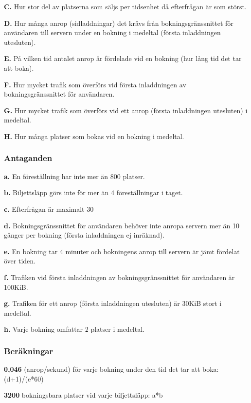 \documentclass[a4paper, twoside, 11pt, titlepage]{article}
\begin{document}
		\textbf{C.} Hur stor del av platserna som säljs per tidsenhet då efterfrågan är som störst.

		\textbf{D.} Hur många anrop (sidladdningar) det krävs från bokningsgränssnittet för användaren till servern under en bokning i medeltal (första inladdningen utesluten).

		\textbf{E.} På vilken tid antalet anrop är fördelade vid en bokning (hur lång tid det tar att boka).

		\textbf{F.} Hur mycket trafik som överförs vid första inladdningen av bokningsgränssnittet för användaren.

		\textbf{G.} Hur mycket trafik som överförs vid ett anrop (första inladdningen utesluten) i medeltal.

		\textbf{H.} Hur många platser som bokas vid en bokning i medeltal.

		\subsubsection{Antaganden}


		\textbf{a.} En föreställning har inte mer än 800 platser.

		\textbf{b.} Biljettsläpp görs inte för mer än 4 föreställningar i taget.

		\textbf{c.} Efterfrågan är maximalt 30%

		\textbf{d.} Bokningsgränssnittet för användaren behöver inte anropa servern mer än 10 gånger per bokning (första inladdningen ej inräknad).

		\textbf{e.} En bokning tar 4 minuter och bokningens anrop till servern är jämt fördelat över tiden. 

		\textbf{f.} Trafiken vid första inladdningen av bokningsgränssnittet för användaren är 100KiB.

		\textbf{g.} Trafiken för ett anrop (första inladdningen utesluten) är 30KiB stort i medeltal. 

		\textbf{h.} Varje bokning omfattar 2 platser i medeltal.

		\subsubsection{Beräkningar}


		\textbf{0,046} (anrop/sekund) för varje bokning under den tid det tar att boka: (d+1)/(e*60)

		\textbf{3200} bokningsbara platser vid varje biljettsläpp: a*b
\end{document}
